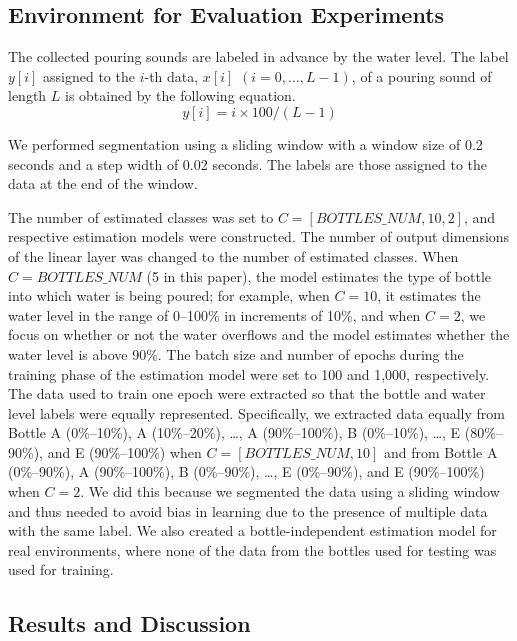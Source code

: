 \documentclass[sigconf]{acmart}
\begin{document}
\subsection{Environment for Evaluation Experiments}
The collected pouring sounds are labeled in advance by the water level. The label $y[i]$ assigned to the $i$-th data, $x[i]$ $(i=0,\dots, L-1)$, of a pouring sound of length $L$ is obtained by the following equation.
\begin{equation}
  y[i]=i \times 100/(L-1)
\end{equation}

We performed segmentation using a sliding window with a window size of 0.2 seconds and a step width of 0.02 seconds. The labels are those assigned to the data at the end of the window.\par

The number of estimated classes was set to $C=[BOTTLES\_NUM,10,2]$, and respective estimation models were constructed. The number of output dimensions of the linear layer was changed to the number of estimated classes. When $C=BOTTLES\_NUM$ (5 in this paper), the model estimates the type of bottle into which water is being poured; for example, when $C=10$, it estimates the water level in the range of 0--100\% in increments of 10\%, and when $C=2$, we focus on whether or not the water overflows and the model estimates whether the water level is above 90\%. The batch size and number of epochs during the training phase of the estimation model were set to 100 and 1,000, respectively. The data used to train one epoch were extracted so that the bottle and water level labels were equally represented. Specifically, we extracted data equally from Bottle A (0\%--10\%), A (10\%--20\%), \dots, A (90\%--100\%), B (0\%--10\%), \dots, E (80\%--90\%), and E (90\%--100\%) when $C=[BOTTLES\_NUM,10]$ and from Bottle A (0\%--90\%), A (90\%--100\%), B (0\%--90\%), \dots, E (0\%--90\%), and E (90\%--100\%) when $C=2$. We did this because we segmented the data using a sliding window and thus needed to avoid bias in learning due to the presence of multiple data with the same label. We also created a bottle-independent estimation model for real environments, where none of the data from the bottles used for testing was used for training.


\subsection{Results and Discussion}
\end{document}
